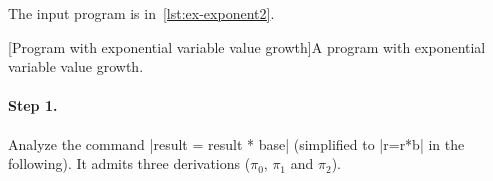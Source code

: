 \begin{example}\label{ex:expprog}
The input program is in~\autoref{lst:ex-exponent2}.

\begin{center}
\begin{minipage}{\textwidth}
\captionsetup{type=lstlisting}
[Program with exponential variable value growth]{A program with exponential variable value growth.}
\label{lst:ex-exponent2}
\end{minipage}
\end{center}

\paragraph*{Step 1.} Analyze the command \pr|result = result * base| (simplified to \pr|r=r*b| in the following).
It admits three derivations (\(\pi_0\), \(\pi_1\) and \(\pi_2\)).


\end{example}
